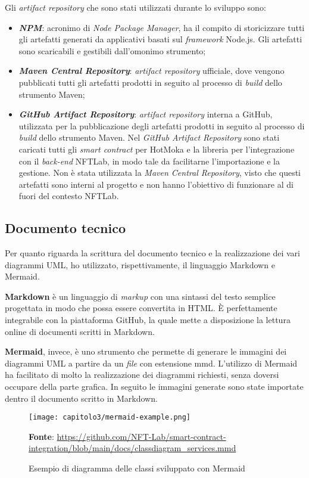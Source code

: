 \noindent Gli \textit{artifact repository} che sono stati utilizzati durante lo sviluppo sono:
\begin{itemize}
  \item \textbf{\textit{NPM}}: acronimo di \textit{Node Package Manager}, ha il compito di storicizzare tutti gli artefatti generati da applicativi basati sul \textit{framework} Node.js. Gli artefatti sono scaricabili e gestibili dall'omonimo strumento;
  \item \textbf{\textit{Maven Central Repository}}: \textit{artifact repository} ufficiale, dove vengono pubblicati tutti gli artefatti prodotti in seguito al processo di \textit{build} dello strumento Maven;
  \item \textbf{\textit{GitHub Artifact Repository}}: \textit{artifact repository} interna a GitHub, utilizzata per la pubblicazione degli artefatti prodotti in seguito al processo di \textit{build} dello strumento Maven. Nel \textit{GitHub Artifact Repository} sono stati caricati tutti gli \textit{smart contract} per HotMoka e la libreria per l'integrazione con il \textit{back-end} NFTLab, in modo tale da facilitarne l'importazione e la gestione. Non è stata utilizzata la \textit{Maven Central Repository}, visto che questi artefatti sono interni al progetto e non hanno l'obiettivo di funzionare al di fuori del contesto NFTLab.
\end{itemize}

\subsection{Documento tecnico}
Per quanto riguarda la scrittura del documento tecnico e la realizzazione dei vari diagrammi UML, ho utilizzato, rispettivamente, il linguaggio Markdown e Mermaid. 

\textbf{Markdown} è un linguaggio di \textit{markup} con una sintassi del testo semplice progettata in modo che possa essere convertita in HTML. È perfettamente integrabile con la piattaforma GitHub, la quale mette a disposizione la lettura online di documenti scritti in Markdown.

\textbf{Mermaid}, invece, è uno strumento che permette di generare le immagini dei diagrammi UML a partire da un \textit{file} con estensione mmd. L'utilizzo di Mermaid ha facilitato di molto la realizzazione dei diagrammi richiesti, senza doversi occupare della parte grafica. In seguito le immagini generate sono state importate dentro il documento scritto in Markdown.

\begin{figure}[h!]
  \centering
  \texttt{[image: capitolo3/mermaid-example.png]}
  \caption{Esempio di diagramma delle classi sviluppato con Mermaid}
  \textbf{Fonte}: \href{https://github.com/NFT-Lab/smart-contract-integration/blob/main/docs/classdiagram\_services.mmd}{https://github.com/NFT-Lab/smart-contract-integration/blob/main/docs/classdiagram\_services.mmd}
\end{figure}

